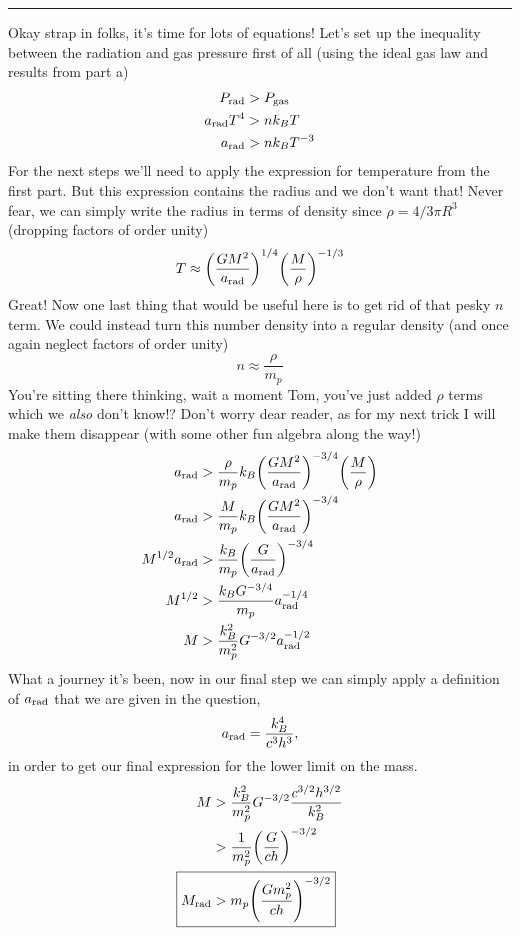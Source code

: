 \documentclass[12pt, letterpaper, twoside]{article}
\newcommand{\answer}[1]{
    \par\noindent\rule{\textwidth}{0.4pt}#1\vspace{0.5cm}
}
\begin{document}
\answer{
    Okay strap in folks, it's time for lots of equations! Let's set up the inequality between the radiation and gas pressure first of all (using the ideal gas law and results from part a)
    \begin{align}
        P_{\rm rad} &> P_{\rm gas} \\
        a_{\rm rad} T^4 &> n k_B T \\
        a_{\rm rad} &> n k_B T^{-3}
    \end{align}
    For the next steps we'll need to apply the expression for temperature from the first part. But this expression contains the radius and we don't want that! Never fear, we can simply write the radius in terms of density since $\rho = 4/3 \pi R^3$ (dropping factors of order unity)
    \begin{equation}
        T \approx \qty(\frac{G M^2}{a_{\rm rad}})^{1/4} \qty(\frac{M}{\rho})^{-1/3}
    \end{equation}
    Great! Now one last thing that would be useful here is to get rid of that pesky $n$ term. We could instead turn this number density into a regular density (and once again neglect factors of order unity)
    \begin{equation}
        n \approx \frac{\rho}{m_p}
    \end{equation}
    You're sitting there thinking, wait a moment Tom, you've just added $\rho$ terms which we \textit{also} don't know!? Don't worry dear reader, as for my next trick I will make them disappear (with some other fun algebra along the way!)
    \begin{align}
        a_{\rm rad} &> \frac{\rho}{m_p} k_B \qty(\frac{G M^2}{a_{\rm rad}})^{-3/4} \qty(\frac{M}{\rho}) \\
        a_{\rm rad} &> \frac{M}{m_p} k_B \qty(\frac{G M^2}{a_{\rm rad}})^{-3/4} \\
        M^{1/2} a_{\rm rad} &> \frac{k_B}{m_p} \qty(\frac{G}{a_{\rm rad}})^{-3/4} \\
        M^{1/2} &> \frac{k_B G^{-3/4}}{m_p} a_{\rm rad}^{-1/4} \\
        M &> \frac{k_B^2}{m_p^2} G^{-3/2} a_{\rm rad}^{-1/2}
    \end{align}
    What a journey it's been, now in our final step we can simply apply a definition of $a_{\rm rad}$ that we are given in the question,
    \begin{equation}
        a_{\rm rad} = \frac{k_B^4}{c^3 h^3},
    \end{equation}
    in order to get our final expression for the lower limit on the mass.
    \begin{align}
        M &> \frac{k_B^2}{m_p^2} G^{-3/2} \frac{c^{3/2} h^{3/2}}{k_B^2} \\
          &> \frac{1}{m_p^2} \qty(\frac{G}{c h})^{-3/2} \\
        \Aboxed{ M_{\rm rad} &> m_p \qty(\frac{G m_p^2}{c h})^{-3/2} }
    \end{align}
}
\end{document}
